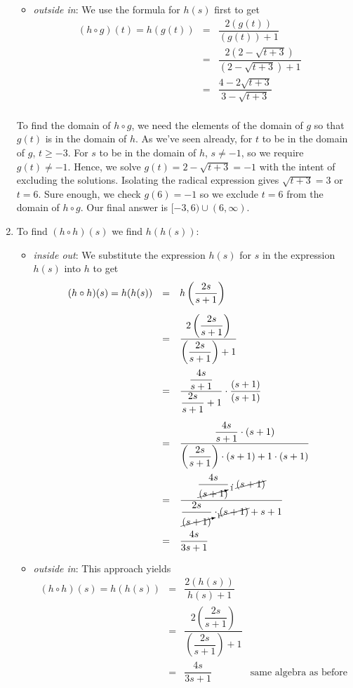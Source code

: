 \begin{ex}
\begin{enumerate}
\begin{itemize}
\item  \textit{outside in}:  We use the formula for $h(s)$ first to get
\[
\begin{array}{rclr} (h \circ g)(t)  =  h(g(t)) & = & \dfrac{2 \left(g(t)\right)}{\left( g(t)\right) + 1} & \\ [12pt]
 & = & \dfrac{2 \left(2-\sqrt{t+3} \right)}{\left(2-\sqrt{t+3}\right)+1} & \\[12pt] 
 & = & \dfrac{4-2\sqrt{t+3}}{3-\sqrt{t+3}} & \\
  \end{array}
 \]
 \end{itemize}

To find the domain of $h \circ g$, we need the elements of the domain of $g$ so that $g(t)$ is in the domain of $h$.  As we've seen already, for $t$ to be in the domain of $g$, $t \geq -3$. For $s$ to be in the domain of $h$, $s \neq -1$, so we require $g(t) \neq -1$.  Hence, we solve $g(t) = 2-\sqrt{t+3} = -1$ with the intent of excluding the solutions. Isolating the radical expression gives $\sqrt{t+3} = 3$ or $t = 6$.  Sure enough, we check $g(6)=-1$ so we exclude $t=6$ from the domain of $h \circ g$.  Our final answer is $[-3, 6) \cup (6, \infty)$.


\item  To find $(h \circ h)(s)$ we find $h(h(s))$:

\begin{itemize}

\item  \textit{inside out}: We substitute the expression $h(s)$ for $s$ in the expression $h(s)$ into $h$ to get
\[
\begin{array}{rclr} (h \circ h)(s)  = h(h(s)) & = &h\left(\dfrac{2s}{s+1}\right) & \\ [15pt]
&=& \dfrac{2\left(\dfrac{2s}{s+1}\right)}{\left(\dfrac{2s}{s+1}\right)+1} & \\ [25pt]
& = & \dfrac{\dfrac{4s}{s+1}}{\dfrac{2s}{s+1}+1} \cdot \dfrac{(s+1)}{(s+1)} & \\ [25pt]
& = & \dfrac{\dfrac{4s}{s+1} \cdot (s+1)}{\left(\dfrac{2s}{s+1}\right)\cdot(s+1)+1\cdot(s+1)} & \\ [25pt]
& = & \dfrac{\dfrac{4s}{\cancelto{1}{(s+1})} \cdot \cancel{(s+1)}}{\dfrac{2s}{\cancelto{1}{(s+1)}}\cdot\cancel{(s+1)}+s+1} & \\ [25pt]
& = & \dfrac{4s}{3s+1} & \\ 
 \end{array}
\]

\item  \textit{outside in}: This approach yields
\[
\begin{array}{rclr} (h \circ h)(s)  =  h(h(s)) & = & \dfrac{2 (h(s))}{h(s) + 1} & \\ [.25in]
& = & \dfrac{2\left(\dfrac{2s}{s+1}\right)}{\left(\dfrac{2s}{s+1}\right)+1} & \\[.35in] 
& = & \dfrac{4s}{3s+1} &  \text{same algebra as before}\\
 \end{array}
\]
\end{itemize}


\end{enumerate}
\end{ex}

